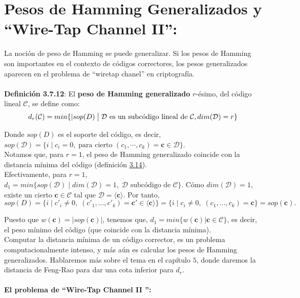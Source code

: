 \documentclass[11pt,spanish]{book}
\begin{document}
\section{Pesos de Hamming Generalizados y ``Wire-Tap Channel II'':}
La noción de peso de Hamming se puede generalizar. Si los pesos de Hamming son importantes en el contexto de códigos correctores, los pesos generalizados aparecen en el problema de ``wiretap chanel'' en criptografía.\\  
\\ \hypertarget{def3.7.12}{\textbf{Definición 3.7.12}}: El \textbf{peso de Hamming generalizado} $r$-ésimo, del código lineal $\mathcal{C}$, se define como:
$$d_{r}(\mathcal{C})=min\{|sop(D)\;\big{|}\;\mathcal{D} \text{ es un subcódigo lineal de } \mathcal{C} , dim(\mathcal{D}) =r\}$$

Donde $sop(D)$ es el soporte del código, es decir, $sop(\mathcal{D}) =\{i\;|\;c_i = 0,\;\text{para cierto }(c_1,\cdots,c_k)=\mathbf{c}\in\mathcal{D}\}$. \\

Notamos que, para $r=1$, el peso de Hamming generalizado coincide con la distancia mínima del código (definición \hyperlink{def3.14}{3.14}). \\

Efectivamente, para $r=1$, $d_1=min\{sop(\mathcal{D})\;|\;dim(\mathcal{D}) = 1,\;\mathcal{D}\text{ subcódigo de } \mathcal{C}\}$. Cómo $dim(\mathcal{D}) = 1$, existe un cierto $\mathbf{c}\in \mathcal{C}$ tal que $\mathcal{D}=\langle \mathbf{c}\rangle $. Por tanto, 
$$sop(D) =\{i\;|\;c'_i \neq 0,\;(c'_1,\ldots,c'_k) =\mathbf{c}'\in\langle \mathbf{c}\rangle\}=\{i\;|\;c_i\neq 0,\;(c_1,\ldots,c_k) =\mathbf{c}\}=sop(\mathbf{c}).$$

Puesto que $w(\mathbf{c})=|sop(\mathbf{c})|$, tenemos que, $d_1=min\{w(\mathbf{c})|\mathbf{c}\in\mathcal{C}\}$, es decir, el peso mínimo del código (que coincide con la distancia mínima).\\

Computar la distancia mínima de un código corrector, es un problema computacionalmente intenso, y más aún es calcular los pesos de Hamming generalizados. Hablaremos más sobre el tema en el capítulo $5$, donde daremos la distancia de Feng-Rao para dar una cota inferior para $d_r$. \\
\\\textbf{El problema de ``Wire-Tap Channel II '':}\\
\end{document}
